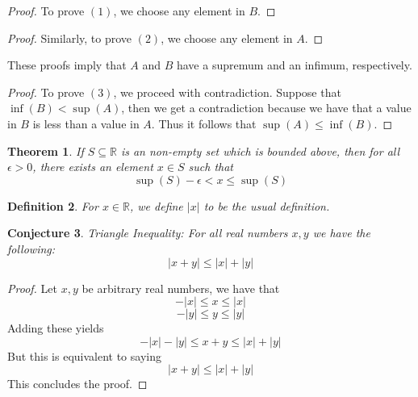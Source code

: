 \documentclass{article}
\newtheorem{theorem}{Theorem}[section]
\newtheorem{definition}[theorem]{Definition}
\newtheorem{conjecture}[theorem]{Conjecture}
\begin{document}
\begin{proof}
    To prove $(1)$, we choose any element in $B$.
\end{proof}

\begin{proof}
    Similarly, to prove $(2)$, we choose any element in $A$.
\end{proof}

These proofs imply that $A$ and $B$ have a supremum and an infimum, respectively.

\begin{proof}
    To prove $(3)$, we proceed with contradiction. Suppose that $\inf(B) < \sup(A)$, then we get a contradiction because we have that a value in $B$ is less than a value in $A$. 
    Thus it follows that $\sup(A) \leq \inf(B)$.
\end{proof}

\begin{theorem}
    If $S \subseteq \mathbb{R}$ is an non-empty set which is bounded above, then for all $\epsilon > 0$, there exists an element $x \in S$ such that 
    \begin{equation}
        \sup(S) - \epsilon < x \leq \sup(S)
    \end{equation}
\end{theorem}

\begin{definition}
    For $x \in \mathbb{R}$, we define $|x|$ to be the usual definition. 
\end{definition}

\begin{conjecture}
    Triangle Inequality: For all real numbers $x, y$ we have the following:
    \begin{equation}
        |x+y| \leq |x| + |y|
    \end{equation}
\end{conjecture}

\begin{proof}
    Let $x,y$ be arbitrary real numbers, we have that
    \begin{equation}
        -|x| \leq x \leq |x|
    \end{equation} 
    \begin{equation}
        -|y| \leq y \leq |y|
    \end{equation}
    Adding these yields 
    \begin{equation}
        -|x| - |y| \leq x + y \leq |x| + |y|
    \end{equation}
    But this is equivalent to saying
    \begin{equation}
        |x + y| \leq |x| + |y|
    \end{equation}
    This concludes the proof. 
\end{proof}
\end{document}
